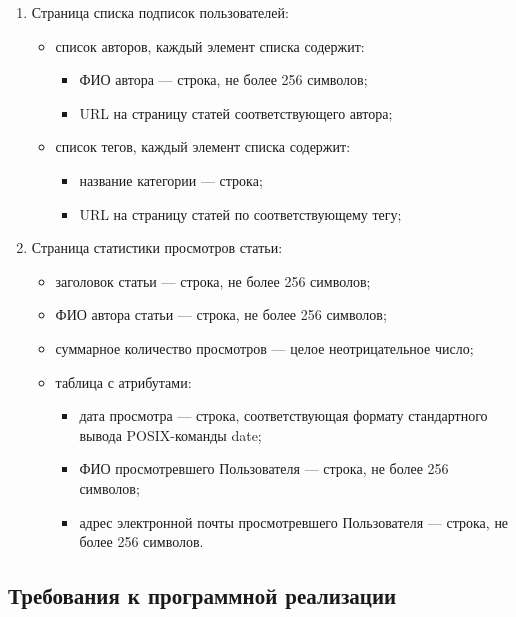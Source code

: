 \documentclass{bmstu-gost-7-32}
\begin{document}
\begin{enumerate}
	\item Страница списка подписок пользователей:
	\begin{itemize}
		\item список авторов, каждый элемент списка содержит:
		\begin{itemize}
			\item ФИО автора — строка, не более 256 символов;
			\item URL на страницу статей соответствующего автора;
		\end{itemize}
		\item список тегов, каждый элемент списка содержит:
		\begin{itemize}
			\item название категории — строка;
			\item URL на страницу статей по соответствующему тегу;
		\end{itemize}
	\end{itemize}

	\item Страница статистики просмотров статьи:
	\begin{itemize}
		\item заголовок статьи — строка, не более 256 символов;
		\item ФИО автора статьи — строка, не более 256 символов;
		\item суммарное количество просмотров — целое неотрицательное число;
		\item таблица с атрибутами:
		\begin{itemize}
			\item дата просмотра — строка, соответствующая формату стандартного вывода POSIX-команды date;
			\item ФИО просмотревшего Пользователя — строка, не более 256 символов;
			\item адрес электронной почты просмотревшего Пользователя — строка, не более 256 символов.
		\end{itemize}
	\end{itemize}
\end{enumerate}

\subsection{Требования к программной реализации}
\end{document}

